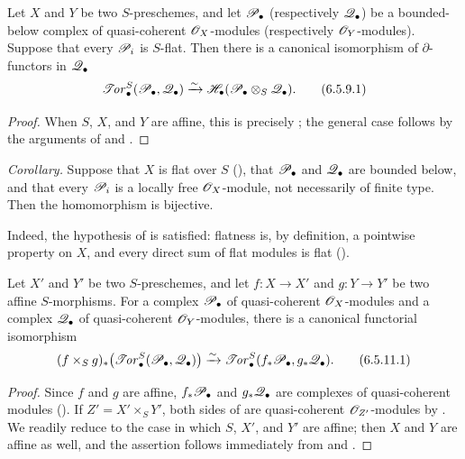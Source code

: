 \begin{corollary}[6.5.9]
\label{III.6.5.9}
Let $X$ and $Y$ be two $S$-preschemes, and let
$\mathscr{P}_\bullet$ (respectively $\mathscr{Q}_\bullet$) be a
bounded-below complex of quasi-coherent $\mathscr{O}_X$-modules
(respectively $\mathscr{O}_Y$-modules).  Suppose that every
$\mathscr{P}_i$ is $S$-flat.  Then there is a canonical isomorphism of
$\partial$-functors in $\mathscr{Q}_\bullet$
\[
  \mathscr{T}\!\mathit{or}_\bullet^S(\mathscr{P}_\bullet,\mathscr{Q}_\bullet)
  \xrightarrow{\sim}
  \mathscr{H}_\bullet(\mathscr{P}_\bullet\otimes_S\mathscr{Q}_\bullet).
  \tag{6.5.9.1}\label{III.6.5.9.1}
\]
\end{corollary}

\begin{proof}
When $S$, $X$, and $Y$ are affine, this is precisely
; the general case follows by the arguments of
 and .
\end{proof}

\begin{env}[6.5.10]
\label{III.6.5.10}
\emph{Corollary.}
Suppose that $X$ is flat over $S$ (), that
$\mathscr{P}_\bullet$ and $\mathscr{Q}_\bullet$ are bounded below, and that
every $\mathscr{P}_i$ is a locally free $\mathscr{O}_X$-module, not
necessarily of finite type.  Then the homomorphism
 is bijective.

Indeed, the hypothesis of  is satisfied:
flatness is, by definition, a pointwise property on $X$, and
every direct sum of flat modules is flat ().
\end{env}

\begin{proposition}[6.5.11]
\label{III.6.5.11}
Let $X'$ and $Y'$ be two $S$-preschemes, and let
$f:X\to X'$ and $g:Y\to Y'$ be two affine $S$-morphisms.  For a
complex $\mathscr{P}_\bullet$ of quasi-coherent $\mathscr{O}_X$-modules and
a complex $\mathscr{Q}_\bullet$ of quasi-coherent $\mathscr{O}_Y$-modules,
there is a canonical functorial isomorphism
\[
  (f\times_Sg)_*
  \bigl(\mathscr{T}\!\mathit{or}_\bullet^S(\mathscr{P}_\bullet,\mathscr{Q}_\bullet)\bigr)
  \xrightarrow{\sim}
  \mathscr{T}\!\mathit{or}_\bullet^S(f_*\mathscr{P}_\bullet,g_*\mathscr{Q}_\bullet).
  \tag{6.5.11.1}\label{III.6.5.11.1}
\]
\end{proposition}

\begin{proof}
Since $f$ and $g$ are affine, $f_*\mathscr{P}_\bullet$ and
$g_*\mathscr{Q}_\bullet$ are complexes of quasi-coherent modules
().  If $Z'=X'\times_SY'$, both sides of
 are quasi-coherent $\mathscr{O}_{Z'}$-modules by
.  We readily reduce to the case in which $S$,
$X'$, and $Y'$ are affine; then $X$ and $Y$ are affine as well,
and the assertion follows immediately from
 and .
\end{proof}

